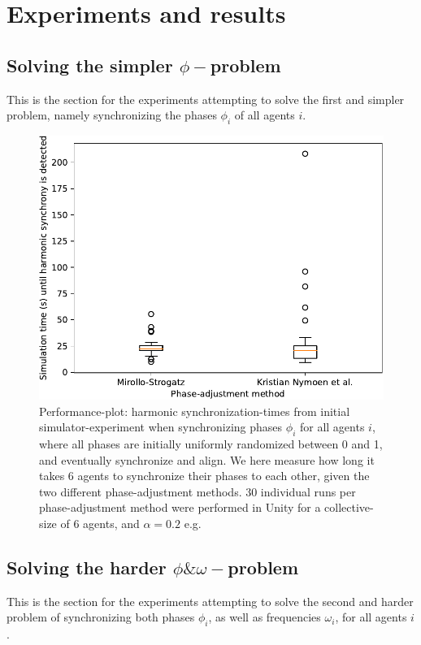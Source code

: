 \chapter{Experiments and results}
	
	\section{Solving the simpler $\phi-$problem}
	This is the section for the experiments attempting to solve the first and simpler problem, namely synchronizing the phases $\phi_i$ of all agents $i$. \nl
	
	\begin{figure}[ht!]
		\centering
		\includegraphics[width=0.7\linewidth]{Assets/Figures/Experiments/FirstExperimentPlot.pdf}
		\caption[Performance-plot from initial simulator-experiment]{Performance-plot: harmonic synchronization-times from initial simulator-experiment when synchronizing phases $\phi_i$ for all agents $i$, where all phases are initially uniformly randomized between 0 and 1, and eventually synchronize and align. We here measure how long it takes 6 agents to synchronize their phases to each other, given the two different phase-adjustment methods. 30 individual runs per phase-adjustment method were performed in Unity for a collective-size of 6 agents, and $\alpha=0.2$ e.g.}
		\label{fig:EPA1}
	\end{figure}
	
	
	\section{Solving the harder $\phi\&\omega-$problem}
	
	This is the section for the experiments attempting to solve the second and harder problem of synchronizing both phases $\phi_i$, as well as frequencies $\omega_i$, for all agents $i$.